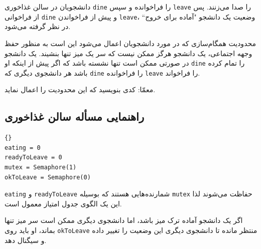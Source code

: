 \documentclass{book}
\newcommand{\clearemptydoublepage}{\newpage\cleardoublepage}
\begin{document}
    دانشجویان در سالن غذاخوری  {\tt dine} را فراخوانده و سپس {\tt leave} را صدا می‌زنند. 
    پس از فراخوانی  {\tt dine}  و پیش از فراخواندن {\tt leave}، وضعیت یک دانشجو "آماده برای خروج`` در نظر گرفته می‌شود. 

    محدودیت‌ همگام‌سازی که در مورد دانشجویان اعمال می‌شود این است به منظور حفظ وجهه اجتماعی، یک دانشجو هرگز ممکن نیست که سر 
    یک میز تنها بنشیند. یک دانشجو در صورتی ممکن است تنها نشسته باشد که  اگر پیش از اینکه او {\tt dine} را تمام کرده باشد
    هر  دانشجوی دیگری که {\tt dine} را فراخوانده‌ {\tt leave} را فراخواند. 

    معمّا: کدی بنویسید که این محدودیت را اعمال نماید. 


\clearemptydoublepage
\subsection{راهنمایی مسأله سالن غذاخوری}

\begin{latin}
\begin{lstlisting}[title=\rl{راهنمایی مسأله سالن غذاخوری}]{}
eating = 0
readyToLeave = 0
mutex = Semaphore(1)
okToLeave = Semaphore(0)
\end{lstlisting}
\end{latin}

    {\tt eating} و {\tt readyToLeave}
    شمارنده‌هایی هستند که بوسیله {\tt mutex} حفاظت می‌شوند لذا این یک الگوی جدول امتیاز معمول است. 
    

    اگر یک دانشجو آماده ترک میز باشد، اما دانشجوی دیگری ممکن است سر میز  تنها بماند، او باید روی {\tt okToLeave}  منتظر مانده تا 
    دانشجوی دیگری این وضعیت را تغییر داده و سیگنال دهد. 
\end{document}
